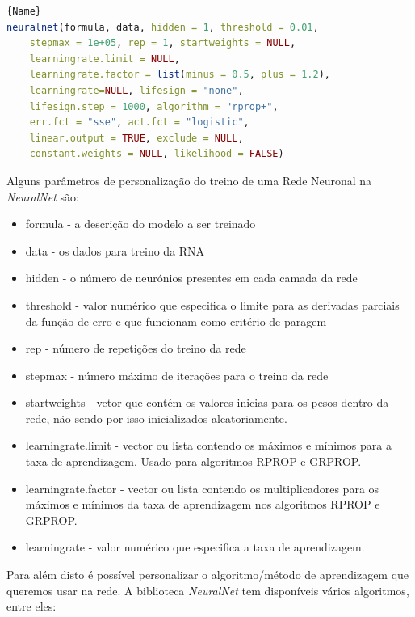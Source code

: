 \vspace{5mm}

\begin{lstlisting}[breaklines,caption=NeuralNet,frame=tlrb,language=r]{Name}
neuralnet(formula, data, hidden = 1, threshold = 0.01,
    stepmax = 1e+05, rep = 1, startweights = NULL,
    learningrate.limit = NULL,
    learningrate.factor = list(minus = 0.5, plus = 1.2),
    learningrate=NULL, lifesign = "none",
    lifesign.step = 1000, algorithm = "rprop+",
    err.fct = "sse", act.fct = "logistic",
    linear.output = TRUE, exclude = NULL,
    constant.weights = NULL, likelihood = FALSE)
\end{lstlisting}

\newpage

Alguns parâmetros de personalização do treino de uma Rede Neuronal na \textit{NeuralNet} são:

\begin{itemize}
    \item formula - a descrição do modelo a ser treinado
    \item data - os dados para treino da RNA
    \item hidden - o número de neurónios presentes em cada camada da rede
    \item threshold - valor numérico que especifica o limite para as derivadas parciais da função de erro e que funcionam como critério de paragem
    \item rep - número de repetições do treino da rede
    \item stepmax - número máximo de iterações para o treino da rede
    \item startweights - vetor que contém os valores inicias para os pesos dentro da rede, não sendo por isso inicializados aleatoriamente.
    \item learningrate.limit - vector ou lista contendo os máximos e mínimos para a taxa de aprendizagem. Usado para algoritmos RPROP e GRPROP.
    \item learningrate.factor - vector ou lista contendo os multiplicadores para os máximos e mínimos da taxa de aprendizagem nos algoritmos RPROP e GRPROP.
    \item learningrate - valor numérico que especifica a taxa de aprendizagem.
\end{itemize}

Para além disto é possível personalizar o algoritmo/método de aprendizagem que queremos usar na rede. A biblioteca \textit{NeuralNet} tem disponíveis vários algoritmos, entre eles:

